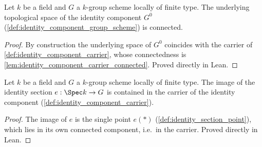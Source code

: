 \begin{lemma}

  \label{lem:identity_component_connected}
  Let \(k\) be a field and \(G\) a \(k\)-group scheme locally of finite
  type. The underlying topological space of the identity component
  \(G^0\) (\cref{def:identity_component_group_scheme}) is connected.
\end{lemma}
\begin{proof}
  By construction the underlying space of \(G^0\) coincides with the
  carrier of \cref{def:identity_component_carrier}, whose connectedness is
  \cref{lem:identity_component_carrier_connected}. Proved directly in
  Lean.
\end{proof}

\begin{lemma}

  \label{lem:identity_component_section_range_subset}
  Let \(k\) be a field and \(G\) a \(k\)-group scheme locally of finite
  type. The image of the identity section \(e : \Spec k \to G\) is
  contained in the carrier of the identity component
  (\cref{def:identity_component_carrier}).
\end{lemma}
\begin{proof}
  The image of \(e\) is the single point \(e(\ast)\)
  (\cref{def:identity_section_point}), which lies in its own connected
  component, i.e.\ in the carrier. Proved directly in Lean.
\end{proof}

